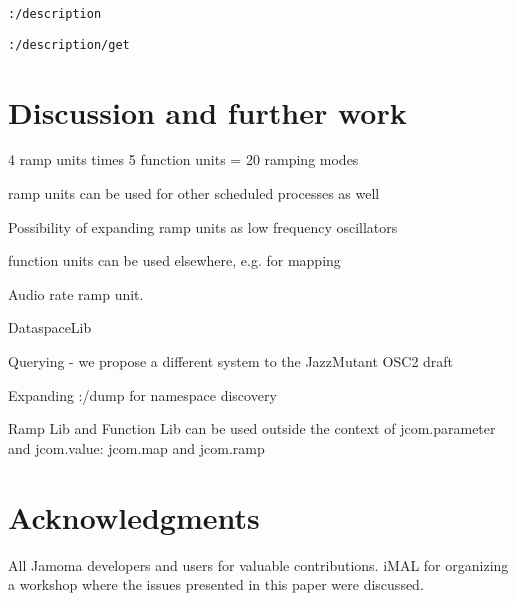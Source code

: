 \documentclass{NIME-alternate}
\begin{document}
\texttt{:/description}

\texttt{:/description/get}







\section{Discussion and further work} %
\label{sec:discussion_and_further_work}

4 ramp units times 5 function units = 20 ramping modes

ramp units can be used for other scheduled processes as well

Possibility of expanding ramp units as low frequency oscillators

function units can be used elsewhere, e.g. for mapping

Audio rate ramp unit.

DataspaceLib

Querying - we propose a different system to the JazzMutant OSC2 draft

Expanding :/dump for namespace discovery

Ramp Lib and Function Lib can be used outside the context of jcom.parameter and jcom.value: jcom.map and jcom.ramp











\section{Acknowledgments} %
\label{sec:acknowledgments}

All Jamoma developers and users for valuable contributions. 
iMAL for organizing a workshop where the issues presented in this paper were discussed.
\end{document}

